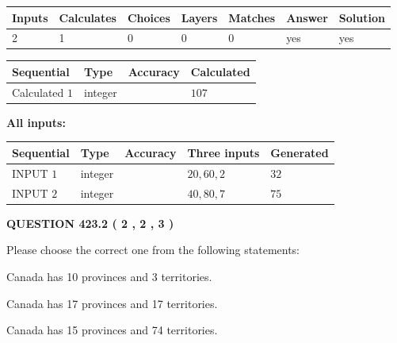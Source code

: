 \documentclass[12pt]{article}
\begin{document}
   
\noindent\begin{tabular}{|l|l|l|l|l|l|l|}
 \hline
Inputs & Calculates & Choices & Layers & Matches & Answer & Solution \\ \hline
 2  & 
 1  & 
 0
  & 
 0  & 
 0  & 
  yes & 
  yes 
  \\ \hline
 \end{tabular}
   
   
   
   
\noindent{}
   
   
  
  
\noindent\begin{tabular}{|l|l|l|l|}
\hline
 Sequential & Type & Accuracy & Calculated \\ 
\hline
 
 
  Calculated $  1 $ & integer &  & 
  $ 107 $ 
 \\  \hline  
 \end{tabular}
   
   
   
   
\noindent\vspace{0.1in}\hspace{-0.08in} {\textbf{\Large{All inputs: }}}
   
   
  
  
\noindent\begin{tabular}{|l|l|l|l|l|}
\hline
 Sequential & Type & Accuracy & Three inputs & Generated \\ 
\hline
 
 
  INPUT $  1 $ & integer &  & $
 20
 , 
 60
 , 
 2
 $ & $ 32 $ 
 \\  \hline  
 
 
  INPUT $  2 $ & integer &  & $
 40
 , 
 80
 , 
 7
 $ & $ 75 $ 
 \\  \hline  
 \end{tabular}
   
   
  
\vspace{0.2in}
  
{\textbf{\Large{QUESTION
423.2 
 ( 2 , 2 , 3 )
}}}
  
  
Please choose the correct one from the following statements:
 
 
Canada has 10  provinces and 3 territories.
 
 
Canada has  17 provinces and  17 territories.
 
 
Canada has  15 provinces and  74 territories.
 
\end{document}
